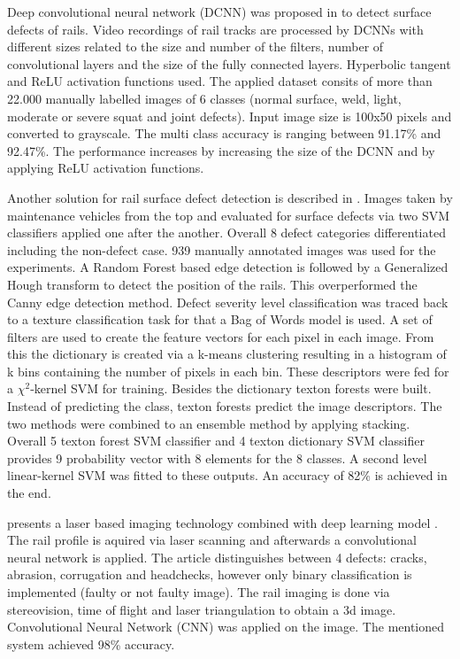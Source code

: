 \documentclass[10pt, final]{article}
\begin{document}
			Deep convolutional neural network (DCNN) was proposed in \cite{faghih-roohi_deep_2016} to detect surface defects of rails.
			Video recordings of rail tracks are processed by DCNNs with different sizes related to the size and number
			of the filters, number of convolutional layers and the size of the fully connected layers.
			Hyperbolic tangent and ReLU activation functions used.
			The applied dataset consits of more than 22.000 manually labelled images of 6 classes 
			(normal surface, weld, light, moderate or severe squat and joint defects).
			Input image size is 100x50 pixels and converted to grayscale.
			The multi class accuracy is ranging between 91.17\% and 92.47\%.
			The performance increases by increasing the size of the DCNN and by applying ReLU activation functions.

			Another solution for rail surface defect detection is described in \cite{ma_texture_2016}.
			Images taken by maintenance vehicles from the top and evaluated for surface defects via two SVM classifiers
			applied one after the another.
			Overall 8 defect categories differentiated including the non-defect case.
			939 manually annotated images was used for the experiments.
			A Random Forest based edge detection is followed by a Generalized Hough transform to detect the position of the rails.
			This overperformed the Canny edge detection method.
			Defect severity level classification was traced back to a texture classification task for that a Bag of Words model
			is used.
			A set of filters are used to create the feature vectors for each pixel in each image.
			From this the dictionary is created via a k-means clustering resulting in a histogram of k bins containing the number
			of pixels in each bin.
			These descriptors were fed for a $\chi^2$-kernel SVM for training.
			Besides the dictionary texton forests were built.
			Instead of predicting the class, texton forests predict the image descriptors.
			The two methods were combined to an ensemble method by applying stacking.
			Overall 5 texton forest SVM classifier and 4 texton dictionary SVM classifier provides 9 probability vector with
			8 elements for the 8 classes.
			A second level linear-kernel SVM was fitted to these outputs.
			An accuracy of 82\% is achieved in the end.

			\citeauthor*{santur_new_2017} presents a laser based imaging technology combined with deep learning model \cite{santur_new_2017}.
			The rail profile is aquired via laser scanning and afterwards a convolutional neural network is applied.
			The article distinguishes between 4 defects: cracks, abrasion, corrugation and headchecks, 
			however only binary classification is implemented (faulty or not faulty image).
			The rail imaging is done via stereovision, time of flight and laser triangulation to obtain a 3d image.
			Convolutional Neural Network (CNN) was applied on the image.
			The mentioned system achieved 98\% accuracy.
\end{document}
